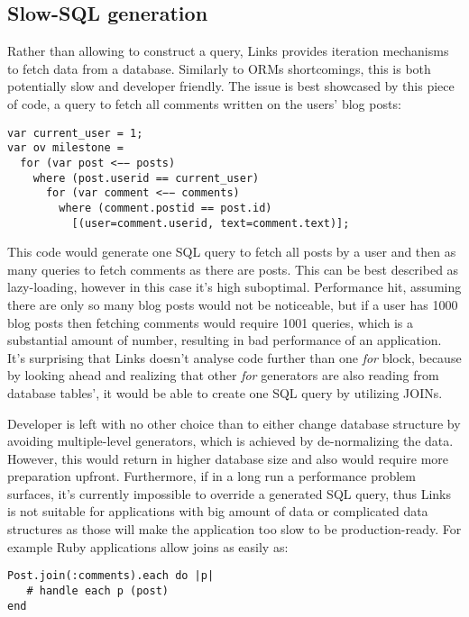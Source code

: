 \subsection{Slow-SQL generation}

Rather than allowing to construct a query, Links provides iteration mechanisms to fetch data from a database. Similarly to ORMs shortcomings, this is both potentially slow and developer friendly. The issue is best showcased by this piece of code, a query to fetch all comments written on the users' blog posts:

\begin{codelisting}
\begin{verbatim}
var current_user = 1;
var ov milestone =
  for (var post <−− posts)
    where (post.userid == current_user)
      for (var comment <−− comments)
        where (comment.postid == post.id)
          [(user=comment.userid, text=comment.text)];
\end{verbatim}
\end{codelisting}

This code would generate one SQL query to fetch all posts by a user and then as many queries to fetch comments as there are posts. This can be best described as lazy-loading\citep{active-record}, however in this case it's high suboptimal. Performance hit, assuming there are only so many blog posts would not be noticeable, but if a user has 1000 blog posts then fetching comments would require 1001 queries, which is a substantial amount of number, resulting in bad performance of an application. It's surprising that Links doesn't analyse code further than one \textit{for} block, because by looking ahead and realizing that other \textit{for} generators are also reading from database tables', it would be able to create one SQL query by utilizing JOINs. 

Developer is left with no other choice than to either change database structure by avoiding multiple-level generators, which is achieved by de-normalizing\citep{normalization} the data. However, this would return in higher database size and also would require more preparation upfront. Furthermore, if in a long run a performance problem surfaces, it's currently impossible to override a generated SQL query, thus Links is not suitable for applications with big amount of data or complicated data structures as those will make the application too slow to be production-ready. For example Ruby applications allow joins as easily as:

\begin{codelisting}
\begin{verbatim}
Post.join(:comments).each do |p|
   # handle each p (post)
end
\end{verbatim}
\end{codelisting}

